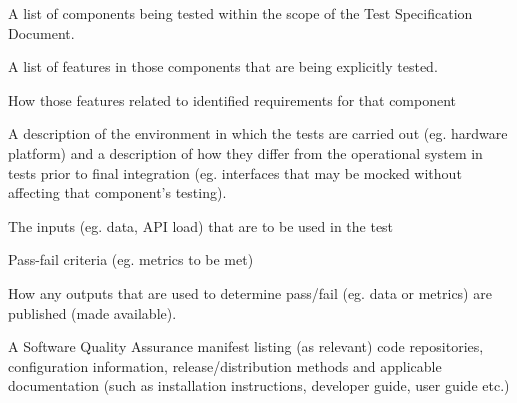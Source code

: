 \begin{itemize_single}

\item A list of components being tested within the scope of the Test Specification Document. 

\item A list of features in those components that are being explicitly tested.

\item How those features related to identified requirements for that component
  
\item A description of the environment in which the tests are carried out (eg. hardware platform) and a description of how they differ from the operational system in tests prior to final integration (eg. interfaces that may be mocked without affecting that component's testing). 
  
\item The inputs (eg. data, API load) that are to be used in the test

\item Pass-fail criteria (eg. metrics to be met) 

\item How any outputs that are used to determine pass/fail (eg. data or metrics) are published (made available). 

\item A Software Quality Assurance manifest listing (as relevant) code repositories, configuration information, release/distribution methods and applicable documentation (such as installation instructions, developer guide, user guide etc.)
  
\end{itemize_single}


